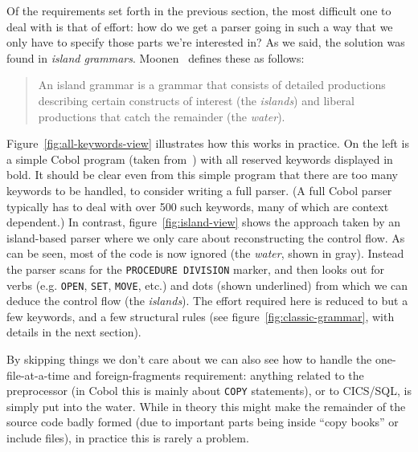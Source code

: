 \documentclass[a4paper]{article}
\begin{document}
Of the requirements set forth in the previous section, the most difficult one to deal with is that of effort: how do we get a parser going in such a way that we only have to specify those parts we're interested in? As we said, the solution was found in \emph{island grammars}. Moonen~\cite{conf:wcre:Moonen01} defines these as follows:
\begin{quotation}
An island grammar is a grammar that consists of detailed productions describing certain constructs of interest (the \emph{islands}) and liberal productions that catch the remainder (the \emph{water}). 
\end{quotation}

Figure~\ref{fig:all-keywords-view} illustrates how this works in practice. On the left is a simple Cobol program (taken from~\cite{conf/aosd/LammelS05}) with all reserved keywords displayed in bold. It should be clear even from this simple program that there are too many keywords to be handled, to consider writing a full parser. (A full Cobol parser typically has to deal with over 500 such keywords, many of which are context dependent.) In contrast, figure~\ref{fig:island-view} shows the approach taken by an island-based parser where we only care about reconstructing the control flow. As can be seen, most of the code is now ignored (the \emph{water}, shown in gray). Instead the parser scans for the \lstinline!PROCEDURE DIVISION! marker, and then looks out for verbs (e.g. \lstinline!OPEN!, \lstinline!SET!, \lstinline!MOVE!, etc.) and dots (shown underlined) from which we can deduce the control flow (the \emph{islands}). The effort required here is reduced to but a few keywords, and a few structural rules (see figure~\ref{fig:classic-grammar}, with details in the next section).

By skipping things we don't care about we can also see how to handle the one-file-at-a-time and foreign-fragments requirement: anything related to the preprocessor (in Cobol this is mainly about \lstinline|COPY| statements), or to CICS/SQL, is simply put into the water. While in theory this might make the remainder of the source code badly formed (due to important parts being inside ``copy books'' or include files), in practice this is rarely a problem.
\end{document}
